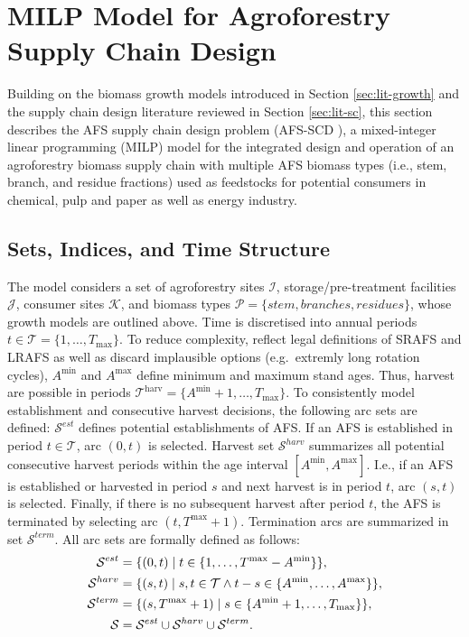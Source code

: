 \documentclass[preprint,review,1p,authoryear]{elsarticle} %
\begin{document}
\section{MILP Model for Agroforestry Supply Chain Design}\label{sec:milp}

Building on the biomass growth models introduced in Section
\ref{sec:lit-growth} and the supply chain design literature reviewed in
Section \ref{sec:lit-sc}, this section describes the AFS supply chain
design problem (AFS-SCD ), a mixed-integer linear programming (MILP)
model for the integrated design and operation of an agroforestry biomass
supply chain with multiple AFS biomass types (i.e., stem, branch,
and residue fractions) used as feedstocks for potential consumers in chemical, pulp and
paper as well as energy industry.

\subsection{Sets, Indices, and Time Structure}\label{sets-indices-and-time-structure}

The model considers a set of agroforestry sites \(\mathcal{I}\), storage/pre-treatment facilities \(\mathcal{J}\), consumer sites \(\mathcal{K}\), and biomass types \(\mathcal{P} = \{stem, branches, residues\}\), whose growth models are outlined above. Time is discretised into annual periods \(t \in \mathcal{T}= \{1,\dots,T_{\max}\}\). To reduce complexity, reflect legal definitions of SRAFS and LRAFS as well as discard implausible options (e.g.~extremly long rotation cycles), \(A^{\min}\) and \(A^{\max}\) define minimum and maximum stand ages. Thus, harvest are possible in periods \(\mathcal{T}^{\text{harv}} = \{A^{\min}+1,\dots,T_{\max}\}\). To consistently model establishment and consecutive harvest decisions, the following arc sets are defined: \(\mathcal{S}^{est}\) defines potential establishments of AFS. If an AFS is established in period \(t \in \mathcal{T}\), arc \((0,t)\) is selected. Harvest set \(\mathcal{S}^{harv}\) summarizes all potential consecutive harvest periods within the age interval \([A^{\min},A^{\max}]\). I.e., if an AFS is established or harvested in period \(s\) and next harvest is in period \(t\), arc \((s,t)\) is selected. Finally, if there is no subsequent harvest after period \(t\), the AFS is terminated by selecting arc \((t,T^{\max}+1)\). Termination arcs are summarized in set \(\mathcal{S}^{term}\). All arc sets are formally defined as
follows: \begin{align}
  \mathcal{S}^{{est}}  &= \{(0,t) \mid t \in \{1,\dots,T^{\max}-A^{\min}\}\}, \notag\\
  \mathcal{S}^{{harv}} &= \{(s,t) \mid s,t \in \mathcal{T}\wedge t-s \in \{A^{\min},\dots,A^{\max}\}\},  \notag\\
  \mathcal{S}^{{term}} &= \{(s,T^{\max}+1) \mid s \in \{A^{\min}+1,\dots,T_{\max}\}\}, \notag\\
  \mathcal{S}&= \mathcal{S}^{{est}} \cup \mathcal{S}^{{harv}} \cup \mathcal{S}^{{term}}. \notag
\end{align}
\end{document}
